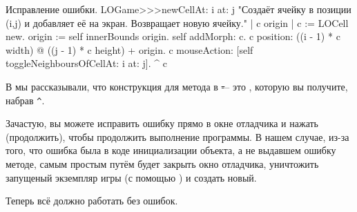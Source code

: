 \documentclass[a4paper,10pt,twoside]{book}
\begin{document}
{%
\begin{method}{Исправление ошибки.}
LOGame>>>newCellAt: i at: j
   "Создаёт ячейку в позиции (i,j) и добавляет её на экран. Возвращает новую ячейку."
   | c origin |
   c := LOCell new.
   origin := self innerBounds origin.
   self addMorph: c.
   c position: ((i - 1) * c width) @ ((j - 1) * c height) + origin.
   c mouseAction: [self toggleNeighboursOfCellAt: i at: j].
   ^ c
\end{method}

\noindent
В  мы рассказывали, что конструкция для   метода в \st --- это \ct{^}, которую вы получите, набрав \verb|^|.

Зачастую, вы можете исправить ошибку прямо в окне отладчика и нажать  (продолжить), чтобы продолжить выполнение программы.
В нашем случае, из-за того, что ошибка была в коде инициализации объекта, а не выдавшем ошибку методе, самым простым путём будет закрыть окно отладчика, уничтожить запущеный экземпляр игры (с помощью ) и создать новый.


Теперь всё должно работать без ошибок.


}
\end{document}
